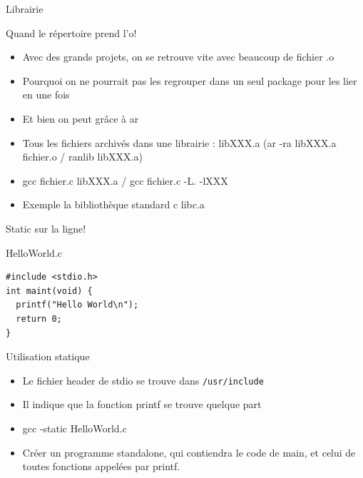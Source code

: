 \def\ftitle{Librairie}
\begin{frame}[containsverbatim]{\ftitle}
\def\blocktitle{Quand le répertoire prend l'o!}
\begin{block}{\blocktitle}
\begin{itemize}
\item Avec des grands projets, on se retrouve vite avec beaucoup de fichier .o
\item Pourquoi on ne pourrait pas les regrouper dans un seul package pour les lier en une fois
\item Et bien on peut grâce à ar
\item Tous les fichiers archivés dans une librairie : libXXX.a (ar -ra libXXX.a fichier.o / ranlib libXXX.a)
\item gcc fichier.c libXXX.a / gcc fichier.c -L. -lXXX
\item Exemple la bibliothèque standard c libc.a
\end{itemize}
\end{block}
\end{frame}

\def\ftitle{Static sur la ligne!}
\begin{frame}[containsverbatim]{\ftitle}
\def\blocktitle{HelloWorld.c}
\begin{block}{\blocktitle}
\begin{verbatim}
#include <stdio.h>
int maint(void) {
  printf("Hello World\n");
  return 0;
}
\end{verbatim}
\end{block}
\def\blocktitle{Utilisation statique}
\begin{block}{\blocktitle}
\begin{itemize}
\item Le fichier header de stdio se trouve dans \verb!/usr/include!
\item Il indique que la fonction printf se trouve quelque part
\item gcc -static HelloWorld.c
\item Créer un programme standalone, qui contiendra le code de main, et celui de toutes fonctions appelées par printf.
\end{itemize}
\end{block}
\end{frame}


